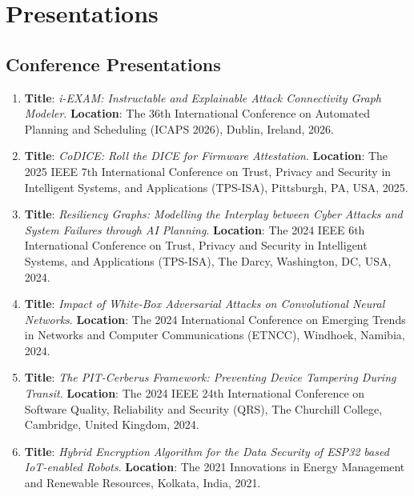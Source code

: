 \documentclass[11pt, a4paper]{article}
\begin{document}
\section{Presentations}

\subsection{\color{cvred}Conference Presentations}

\begin{enumerate}[leftmargin=*, label=\arabic*., itemsep=4pt, topsep=2pt]

\item \textbf{Title}: \textit{\color{cvred}i-EXAM: Instructable and Explainable Attack Connectivity Graph Modeler}. \textbf{Location}: The 36th International Conference on Automated Planning and Scheduling (ICAPS 2026), Dublin, Ireland, 2026.

\item \textbf{Title}: \textit{\color{cvred}CoDICE: Roll the DICE for Firmware Attestation}. \textbf{Location}: The 2025 IEEE 7th International Conference on Trust, Privacy and Security in Intelligent Systems, and Applications (TPS-ISA), Pittsburgh, PA, USA, 2025.

\item \textbf{Title}: \textit{\color{cvred}Resiliency Graphs: Modelling the Interplay between Cyber Attacks and System Failures through AI Planning}. \textbf{Location}: The 2024 IEEE 6th International Conference on Trust, Privacy and Security in Intelligent Systems, and Applications (TPS-ISA), The Darcy, Washington, DC, USA, 2024.

\item \textbf{Title}: \textit{\color{cvred}Impact of White-Box Adversarial Attacks on Convolutional Neural Networks}. \textbf{Location}: The 2024 International Conference on Emerging Trends in Networks and Computer Communications (ETNCC), Windhoek, Namibia, 2024.

\item \textbf{Title}: \textit{\color{cvred}The PIT-Cerberus Framework: Preventing Device Tampering During Transit}. \textbf{Location}: The 2024 IEEE 24th International Conference on Software Quality, Reliability and Security (QRS), The Churchill College, Cambridge, United Kingdom, 2024.

\item \textbf{Title}: \textit{\color{cvred}Hybrid Encryption Algorithm for the Data Security of ESP32 based IoT-enabled Robots}. \textbf{Location}: The 2021 Innovations in Energy Management and Renewable Resources, Kolkata, India, 2021.

\end{enumerate}
\end{document}
